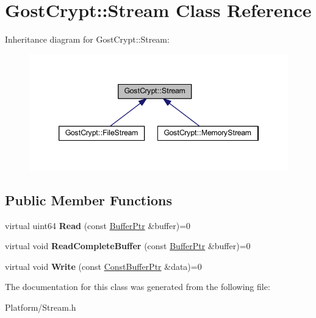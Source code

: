 \hypertarget{class_gost_crypt_1_1_stream}{}\section{Gost\+Crypt\+:\+:Stream Class Reference}
\label{class_gost_crypt_1_1_stream}


Inheritance diagram for Gost\+Crypt\+:\+:Stream\+:
\nopagebreak
\begin{figure}[H]
\begin{center}
\leavevmode
\includegraphics[width=346pt]{class_gost_crypt_1_1_stream__inherit__graph}
\end{center}
\end{figure}
\subsection*{Public Member Functions}
\begin{DoxyCompactItemize}
\item 
\mbox{\label{class_gost_crypt_1_1_stream_a068c3929de9e2dc4340136ce38e02a81}} 
virtual uint64 {\bfseries Read} (const \hyperlink{class_gost_crypt_1_1_buffer_ptr}{Buffer\+Ptr} \&buffer)=0
\item 
\mbox{\label{class_gost_crypt_1_1_stream_a732e47587e0c3248220bedca671177dc}} 
virtual void {\bfseries Read\+Complete\+Buffer} (const \hyperlink{class_gost_crypt_1_1_buffer_ptr}{Buffer\+Ptr} \&buffer)=0
\item 
\mbox{\label{class_gost_crypt_1_1_stream_af0b2cdb84ea8c7a74e924d415225ae9b}} 
virtual void {\bfseries Write} (const \hyperlink{class_gost_crypt_1_1_const_buffer_ptr}{Const\+Buffer\+Ptr} \&data)=0
\end{DoxyCompactItemize}


The documentation for this class was generated from the following file\+:\begin{DoxyCompactItemize}
\item 
Platform/Stream.\+h\end{DoxyCompactItemize}
